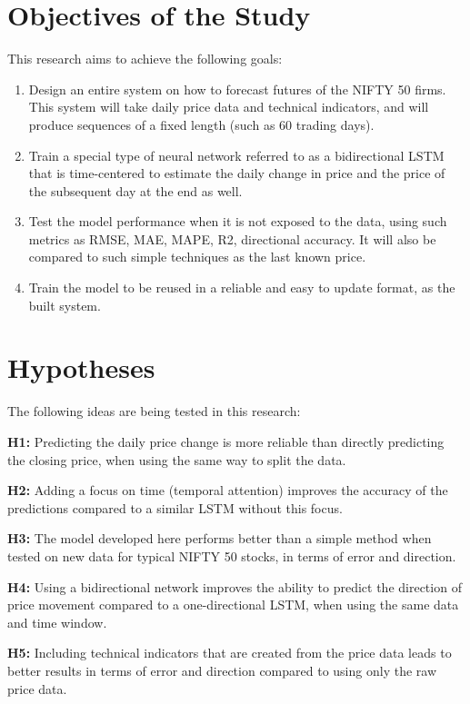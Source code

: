\documentclass[conference]{IEEEtran}
\begin{document}
\section{Objectives of the Study}

This research aims to achieve the following goals:

\begin{enumerate}
\item Design an entire system on how to forecast futures of the NIFTY 50 firms. This system will take daily price data and technical indicators, and will produce sequences of a fixed length (such as 60 trading days).
\item Train a special type of neural network referred to as a bidirectional LSTM that is time-centered to estimate the daily change in price and the price of the subsequent day at the end as well.
\item Test the model performance when it is not exposed to the data, using such metrics as RMSE, MAE, MAPE, R2, directional accuracy. It will also be compared to such simple techniques as the last known price.
\item Train the model to be reused in a reliable and easy to update format, as the built system.
\end{enumerate}

\section{Hypotheses}

The following ideas are being tested in this research:

\textbf{H1:} Predicting the daily price change is more reliable than directly predicting the closing price, when using the same way to split the data.

\textbf{H2:} Adding a focus on time (temporal attention) improves the accuracy of the predictions compared to a similar LSTM without this focus.

\textbf{H3:} The model developed here performs better than a simple method when tested on new data for typical NIFTY 50 stocks, in terms of error and direction.

\textbf{H4:} Using a bidirectional network improves the ability to predict the direction of price movement compared to a one-directional LSTM, when using the same data and time window.

\textbf{H5:} Including technical indicators that are created from the price data leads to better results in terms of error and direction compared to using only the raw price data.
\end{document}
